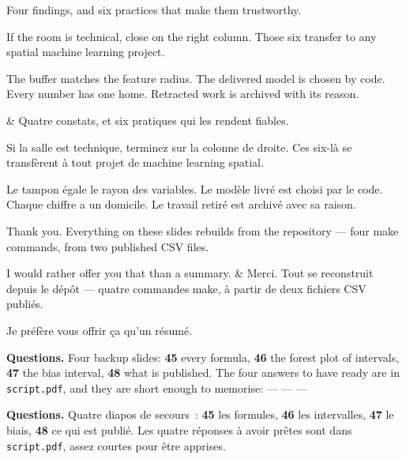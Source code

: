 \documentclass[10pt,a4paper]{article}
\begin{document}
\begin{say}
Four findings, and six practices that make them trustworthy.

If the room is technical, close on the right column. Those six transfer to any
spatial machine learning project.

The buffer matches the feature radius. The delivered model is chosen by code.
Every number has one home. Retracted work is archived with its reason.

&
Quatre constats, et six pratiques qui les rendent fiables.

Si la salle est technique, terminez sur la colonne de droite. Ces six-là se
transfèrent à tout projet de machine learning spatial.

Le tampon égale le rayon des variables. Le modèle livré est choisi par le code.
Chaque chiffre a un domicile. Le travail retiré est archivé avec sa raison.

\end{say}

\begin{say}
Thank you. Everything on these slides rebuilds from the repository --- four make
commands, from two published CSV files.

I would rather offer you that than a summary.
&
Merci. Tout se reconstruit depuis le dépôt --- quatre commandes make, à partir de
deux fichiers CSV publiés.

Je préfère vous offrir ça qu'un résumé.
\end{say}

\vspace{6mm}
\noindent
\colorbox{wash}{\parbox{\dimexpr\textwidth-2\fboxsep}{\vspace{1.5mm}
\textbf{Questions.} Four backup slides: \textbf{45} every formula, \textbf{46} the
forest plot of intervals, \textbf{47} the bias interval, \textbf{48} what is
published. The four answers to have ready are in \texttt{script.pdf}, and they are
short enough to memorise:  ---
 ---  --- 

\medskip
{}
\textbf{Questions.} Quatre diapos de secours~: \textbf{45} les formules,
\textbf{46} les intervalles, \textbf{47} le biais, \textbf{48} ce qui est publié.
Les quatre réponses à avoir prêtes sont dans \texttt{script.pdf}, assez courtes
pour être apprises.
\vspace{1.5mm}}}
\end{document}
